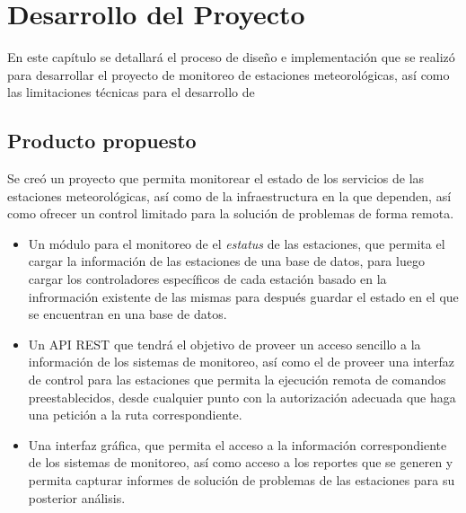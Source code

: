 
\chapter{Desarrollo del Proyecto}


En este capítulo se detallará el proceso de diseño e implementación que se realizó para desarrollar el proyecto de monitoreo de estaciones meteorológicas, así como las limitaciones técnicas para el desarrollo de


\section{Producto propuesto}

Se creó un proyecto que permita monitorear el estado de los servicios de las estaciones meteorológicas, así como de la infraestructura en la que dependen, así como ofrecer un control limitado para la solución de problemas de forma remota.



\begin{itemize}
   \item Un módulo para el monitoreo de el \textit{estatus} de las estaciones, que permita el cargar la información de las estaciones de una base de datos, para luego cargar los controladores específicos de cada estación basado en la infrormación existente de las mismas para después guardar el estado en el que se encuentran en una base de datos.

   \item Un API REST que tendrá el objetivo de proveer un acceso sencillo a la información de los sistemas de monitoreo, así como el de proveer una interfaz de control para las estaciones que permita la ejecución remota de comandos preestablecidos, desde cualquier punto con la autorización adecuada que haga una petición a la ruta correspondiente.

   \item Una interfaz gráfica, que permita el acceso a la información correspondiente de los sistemas de monitoreo, así como acceso a los reportes que se generen y permita capturar informes de solución de problemas de las estaciones para su posterior análisis.

\end{itemize}

